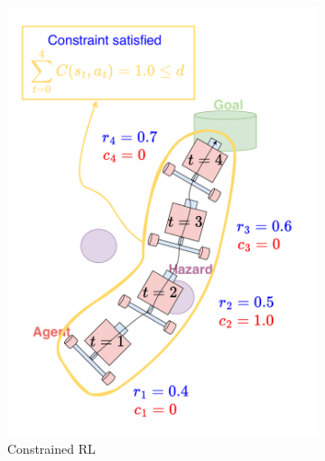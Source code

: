\begin{figure}[H]
    \centering

    \begin{subfigure}{0.46\textwidth}
        \centering
        \includegraphics[width=\linewidth]{figure/constrained-rl.pdf}
        \caption{Constrained RL}
    \end{subfigure}
    \hfill
    \begin{subfigure}{0.48\textwidth}
        \centering

\end{subfigure}
\end{figure}
